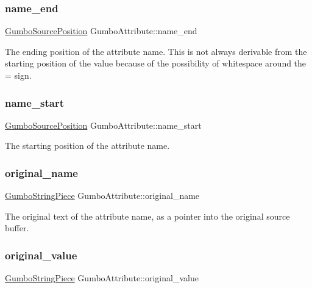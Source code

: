\subsubsection{\texorpdfstring{name\+\_\+end}{name\_end}}
{\footnotesize\ttfamily \mbox{\hyperlink{struct_gumbo_source_position}{Gumbo\+Source\+Position}} Gumbo\+Attribute\+::name\+\_\+end}

The ending position of the attribute name. This is not always derivable from the starting position of the value because of the possibility of whitespace around the = sign. \mbox{\label{struct_gumbo_attribute_a14f25692d8f8ad48560cbb27d0e792fc}} 
\subsubsection{\texorpdfstring{name\+\_\+start}{name\_start}}
{\footnotesize\ttfamily \mbox{\hyperlink{struct_gumbo_source_position}{Gumbo\+Source\+Position}} Gumbo\+Attribute\+::name\+\_\+start}

The starting position of the attribute name. \mbox{\label{struct_gumbo_attribute_a6f535bba33535c0401bce8bc5459ffb3}} 
\subsubsection{\texorpdfstring{original\+\_\+name}{original\_name}}
{\footnotesize\ttfamily \mbox{\hyperlink{struct_gumbo_string_piece}{Gumbo\+String\+Piece}} Gumbo\+Attribute\+::original\+\_\+name}

The original text of the attribute name, as a pointer into the original source buffer. \mbox{\label{struct_gumbo_attribute_a578fc88b2b00d6468fb5445f71e11cda}} 
\subsubsection{\texorpdfstring{original\+\_\+value}{original\_value}}
{\footnotesize\ttfamily \mbox{\hyperlink{struct_gumbo_string_piece}{Gumbo\+String\+Piece}} Gumbo\+Attribute\+::original\+\_\+value}

